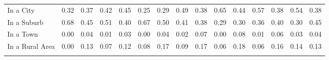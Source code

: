 \begin{tabular*}{\linewidth}{@{\extracolsep{\fill} } lcccccccccccccc}
\hspace{0.2cm}In a City&0.32&0.37&0.42&0.45&0.25&0.29&0.49&0.38&0.65&0.44&0.57&0.38&0.54&0.38\\%
\hspace{0.2cm}In a Suburb&0.68&0.45&0.51&0.40&0.67&0.50&0.41&0.38&0.29&0.30&0.36&0.40&0.30&0.45\\%
\hspace{0.2cm}In a Town&0.00&0.04&0.01&0.03&0.00&0.04&0.02&0.07&0.00&0.08&0.01&0.06&0.03&0.04\\%
\hspace{0.2cm}In a Rural Area&0.00&0.13&0.07&0.12&0.08&0.17&0.09&0.17&0.06&0.18&0.06&0.16&0.14&0.13\\%
&&&&&&&&&&&&&&\\%
\hline%
\end{tabular*}